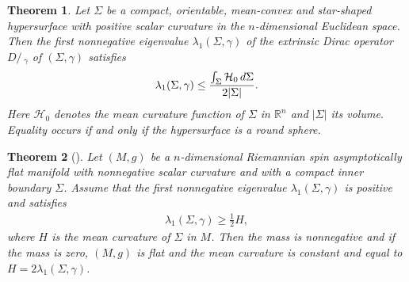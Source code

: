 \documentclass[10pt,a4paper]{article}
\numberwithin{equation}{section}
\newtheorem{Theorem}{Theorem}[section]
\theoremstyle{definition}
\def\D{D\!\!\!\!/\,}
\begin{document}
\begin{Theorem}\label{NewUpperBound}
Let $\Sigma$ be a compact, orientable, mean-convex and star-shaped hypersurface with positive scalar curvature in the $n$-dimensional Euclidean space. Then the first nonnegative eigenvalue $\lambda_1(\Sigma,\gamma)$ of the extrinsic Dirac operator $\D_\gamma$ of $(\Sigma,\gamma)$ satisfies
\begin{gather}\label{NewUpperBound1}
\lambda_1(\Sigma,\gamma)\leq\frac{\int_\Sigma \mathcal{H}_0\,{\rm d}\Sigma}{2|\Sigma|}.
\end{gather}
Here $\mathcal{H}_0$ denotes the mean curvature function of $\Sigma$ in $\mathbb{R}^{n}$ and $|\Sigma|$ its volume. Equality occurs if and only if the hypersurface is a round sphere.
\end{Theorem}

\begin{Theorem}[\cite{Herzlich1,Herzlich2}]\label{HerzlichPMT-n}
Let $(M,g)$ be a $n$-dimensional Riemannian spin asymptotically flat manifold with nonnegative scalar curvature and with a compact inner boundary $\Sigma$. Assume that the first nonnegative eigenvalue $\lambda_1(\Sigma,\gamma)$ is positive and satisfies
\begin{gather}\label{DiracMeanCur-n}
\lambda_1(\Sigma,\gamma)\geq\frac{1}{2}H,
\end{gather}
where $H$ is the mean curvature of $\Sigma$ in $M$. Then the mass is nonnegative and if the mass is zero, $(M,g)$ is flat and the mean curvature is constant and equal to $H=2\lambda_1(\Sigma,\gamma)$.
\end{Theorem}
\end{document}
